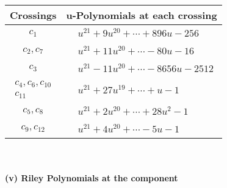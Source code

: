 \documentclass[1p]{elsarticle_modified}
\theoremstyle{definition}
\begin{document}
\begin{tabular}{m{50pt}|m{274pt}}
Crossings & \hspace{64pt}u-Polynomials at each crossing \\
\hline $$\begin{aligned}c_{1}\end{aligned}$$&$\begin{aligned}
&u^{21}+9 u^{20}+\cdots+896 u-256
\end{aligned}$\\
\hline $$\begin{aligned}c_{2},c_{7}\end{aligned}$$&$\begin{aligned}
&u^{21}+11 u^{20}+\cdots-80 u-16
\end{aligned}$\\
\hline $$\begin{aligned}c_{3}\end{aligned}$$&$\begin{aligned}
&u^{21}-11 u^{20}+\cdots-8656 u-2512
\end{aligned}$\\
\hline $$\begin{aligned}c_{4},c_{6},c_{10}\\c_{11}\end{aligned}$$&$\begin{aligned}
&u^{21}+27 u^{19}+\cdots+u-1
\end{aligned}$\\
\hline $$\begin{aligned}c_{5},c_{8}\end{aligned}$$&$\begin{aligned}
&u^{21}+2 u^{20}+\cdots+28 u^2-1
\end{aligned}$\\
\hline $$\begin{aligned}c_{9},c_{12}\end{aligned}$$&$\begin{aligned}
&u^{21}+4 u^{20}+\cdots-5 u-1
\end{aligned}$\\
\hline
\end{tabular}\\~\\
\newpage\renewcommand{\arraystretch}{1}
\flushleft \textbf{(v) Riley Polynomials at the component}\newline \\
\end{document}
